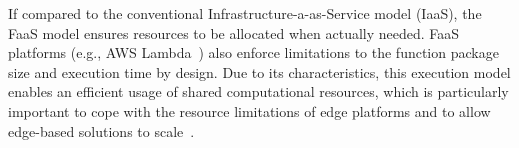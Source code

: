If compared to the conventional Infrastructure-a-as-Service model (IaaS), the FaaS model ensures resources to be allocated when actually needed. FaaS platforms (e.g., AWS Lambda~\cite{AWSLambda}) also enforce limitations to the function package size and execution time by design. Due to its characteristics, this execution model enables an efficient usage of shared computational resources, which is particularly important to cope with the resource limitations of edge platforms and to allow edge-based solutions to scale~\cite{GarrigaMendonca2017}.





%



